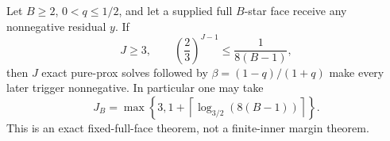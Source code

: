 \documentclass[11pt]{article}
\begin{document}
\begin{theorem}
\label{thm:star-logarithmic-warmup}
Let $B\geq2$, $0<q\leq1/2$, and let a supplied full $B$-star face receive any
nonnegative residual $y$.  If
\begin{equation}
 J\geq3,\qquad
 \left(\frac23\right)^{J-1}\leq\frac{1}{8(B-1)},
 \label{eq:star-logarithmic-condition}
\end{equation}
then $J$ exact pure-prox solves followed by
$\beta=(1-q)/(1+q)$ make every later trigger nonnegative.  In particular one
may take
\begin{equation}
 J_B=\max\left\{3,
 1+\left\lceil\log_{3/2}(8(B-1))\right\rceil\right\}.
 \label{eq:star-logarithmic-warmup}
\end{equation}
This is an exact fixed-full-face theorem, not a finite-inner margin theorem.
\end{theorem}
\end{document}
